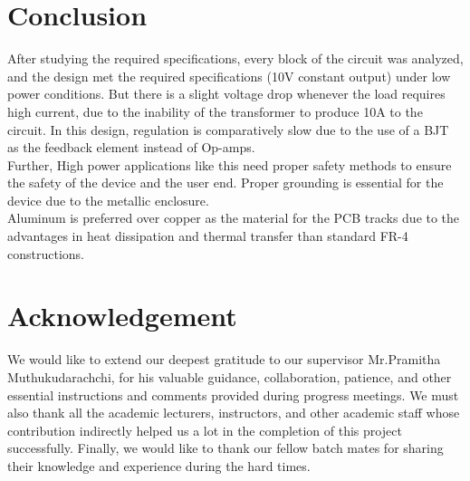 \documentclass[11pt]{article}
\begin{document}
\begin{multicols}{2}
\section{Conclusion}
After studying the required specifications, every block of the circuit was analyzed, and the design met the required specifications (10V constant output) under low power conditions. But there is a slight voltage drop whenever the load requires high current, due to the inability of the transformer to produce 10A to the circuit. In this design, regulation is comparatively slow due to the use of a BJT as the feedback element instead of Op-amps.\\
Further, High power applications like this need proper safety methods to ensure the safety of the device and the user end. Proper grounding is essential for the device due to the metallic enclosure.\\
Aluminum is preferred over copper as the material for the PCB tracks due to the advantages in heat dissipation and thermal transfer than standard FR-4 constructions. \\


\section{Acknowledgement}
We would like to extend our deepest gratitude to
our supervisor Mr.Pramitha Muthukudarachchi, for his
valuable guidance, collaboration, patience, and
other essential instructions and comments provided
during progress meetings.
We must also thank all the academic lecturers, instructors,
and other academic staff whose contribution
indirectly helped us a lot in the completion
of this project successfully.
Finally, we would like to thank our fellow batch
mates for sharing their knowledge and experience
during the hard times.
\end{multicols}



\nocite{*}
\medskip


\end{document}
